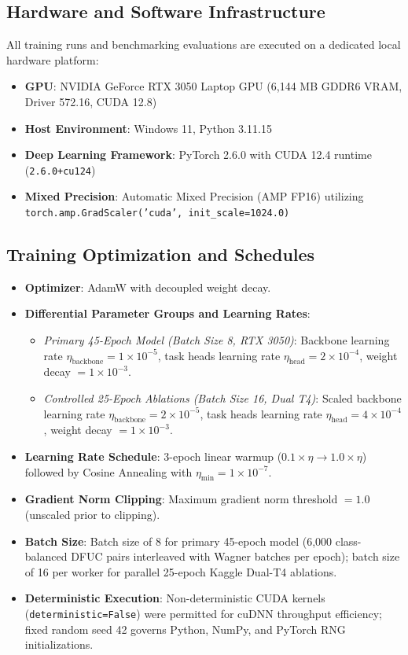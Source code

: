\documentclass[journal]{IEEEtran}
\begin{document}
\subsection{Hardware and Software Infrastructure}
All training runs and benchmarking evaluations are executed on a dedicated local hardware platform:
\begin{itemize}
    \item \textbf{GPU}: NVIDIA GeForce RTX 3050 Laptop GPU (6,144 MB GDDR6 VRAM, Driver 572.16, CUDA 12.8)
    \item \textbf{Host Environment}: Windows 11, Python 3.11.15
    \item \textbf{Deep Learning Framework}: PyTorch 2.6.0 with CUDA 12.4 runtime (\texttt{2.6.0+cu124})
    \item \textbf{Mixed Precision}: Automatic Mixed Precision (AMP FP16) utilizing \texttt{torch.amp.GradScaler('cuda', init\_scale=1024.0)}
\end{itemize}

\subsection{Training Optimization and Schedules}
\begin{itemize}
    \item \textbf{Optimizer}: AdamW with decoupled weight decay.
    \item \textbf{Differential Parameter Groups and Learning Rates}:
    \begin{itemize}
        \item \textit{Primary 45-Epoch Model (Batch Size 8, RTX 3050)}: Backbone learning rate $\eta_{\text{backbone}} = 1 \times 10^{-5}$, task heads learning rate $\eta_{\text{head}} = 2 \times 10^{-4}$, weight decay $= 1 \times 10^{-3}$.
        \item \textit{Controlled 25-Epoch Ablations (Batch Size 16, Dual T4)}: Scaled backbone learning rate $\eta_{\text{backbone}} = 2 \times 10^{-5}$, task heads learning rate $\eta_{\text{head}} = 4 \times 10^{-4}$, weight decay $= 1 \times 10^{-3}$.
    \end{itemize}
    \item \textbf{Learning Rate Schedule}: 3-epoch linear warmup ($0.1 \times \eta \to 1.0 \times \eta$) followed by Cosine Annealing with $\eta_{\min} = 1 \times 10^{-7}$.
    \item \textbf{Gradient Norm Clipping}: Maximum gradient norm threshold $= 1.0$ (unscaled prior to clipping).
    \item \textbf{Batch Size}: Batch size of 8 for primary 45-epoch model (6,000 class-balanced DFUC pairs interleaved with Wagner batches per epoch); batch size of 16 per worker for parallel 25-epoch Kaggle Dual-T4 ablations.
    \item \textbf{Deterministic Execution}: Non-deterministic CUDA kernels (\texttt{deterministic=False}) were permitted for cuDNN throughput efficiency; fixed random seed 42 governs Python, NumPy, and PyTorch RNG initializations.
\end{itemize}
\end{document}
